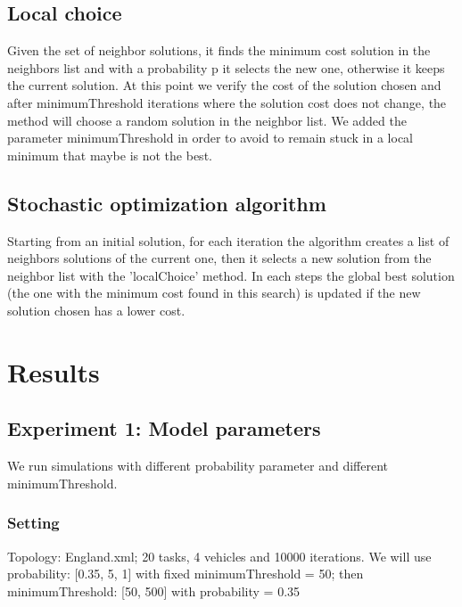 \documentclass[11pt]{article}
\begin{document}
\subsection{Local choice}
Given the set of neighbor solutions, it finds the minimum cost solution in the neighbors list and with a probability p it selects the new one, otherwise it keeps the current solution. At this point we verify the cost of the solution chosen and after minimumThreshold iterations where the solution cost does not change, the method will choose a random solution in the neighbor list. We added the parameter minimumThreshold in order to avoid to remain stuck in a local minimum that maybe is not the best.

\subsection{Stochastic optimization algorithm}
Starting from an initial solution, for each iteration the algorithm creates a list of neighbors solutions of the current one, then it selects a new solution from the neighbor list with the 'localChoice' method. In each steps the global best solution (the one with the minimum cost found in this search) is updated if the new solution chosen has a lower cost.

\section{Results}

\subsection{Experiment 1: Model parameters}
We run simulations with different probability parameter and different minimumThreshold.

\subsubsection{Setting}
Topology: England.xml; 20 tasks, 4 vehicles and 10000 iterations. We will use probability: [0.35, 5, 1] with fixed minimumThreshold = 50; then minimumThreshold: [50, 500] with probability = 0.35
\end{document}
